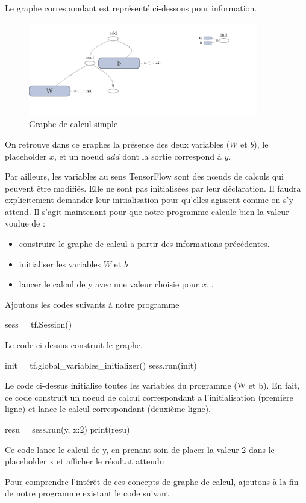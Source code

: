 \documentclass[a4paper,11pt]{book}
\theoremstyle{theo}
\begin{document}
Le graphe correspondant est représenté ci-dessous pour information.
\begin{figure}[H]

\begin{center}
\includegraphics[width=10cm]{./figures/graphAddition.png} 
\end{center}
\caption{Graphe de calcul simple}
\end{figure}

On retrouve dans ce graphes la présence des deux variables ($W$ et $b$), le placeholder $x$, et un noeud $add$ dont la sortie correspond à $y$.


Par ailleurs, les variables au sens TensorFlow sont des nœuds de calculs qui peuvent être modifiés. Elle ne sont pas initialisées par leur déclaration. Il faudra explicitement demander leur initialisation pour qu'elles agissent comme on s'y attend.
Il s'agit maintenant pour que notre programme calcule bien la valeur voulue de :
\begin{itemize}
\item construire le graphe de calcul a partir des informations précédentes.
\item initialiser les variables $W$ et $b$
\item lancer le calcul de y avec une valeur choisie pour $x$...
\end{itemize}

Ajoutons les codes suivants à notre programme
\begin{mypython}
sess = tf.Session()
\end{mypython}
Le code ci-dessus construit le graphe.
\begin{mypython}
init = tf.global_variables_initializer()
sess.run(init)
\end{mypython}
Le code ci-dessus initialise toutes les variables du programme (W et b). En fait, ce code construit un noeud de calcul correspondant a l'initialisation (première ligne) et lance le calcul correspondant (deuxième ligne).

\begin{mypython} 
resu = sess.run(y, {x:2}) 
print(resu)
\end{mypython}
Ce code lance le calcul de y, en prenant soin de placer la valeur 2 dans le placeholder x et afficher le résultat attendu
\begin{myoutput}
[0.3]
\end{myoutput}
Pour comprendre l'intérêt de ces concepts de graphe de calcul, ajoutons à la fin de notre programme existant le code suivant :
\end{document}
